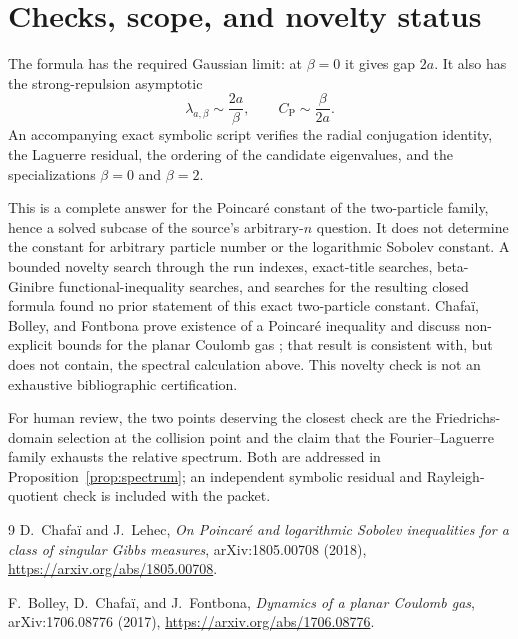 \documentclass[11pt]{article}
\begin{document}
\section{Checks, scope, and novelty status}

The formula has the required Gaussian limit: at $\beta=0$ it gives gap
$2a$.  It also has the strong-repulsion asymptotic
\[
 \lambda_{a,\beta}\sim\frac{2a}{\beta},\qquad
 C_{\mathrm P}\sim\frac{\beta}{2a}.
\]
An accompanying exact symbolic script verifies the radial conjugation
identity, the Laguerre residual, the ordering of the candidate eigenvalues,
and the specializations $\beta=0$ and $\beta=2$.

This is a complete answer for the Poincar\'e constant of the two-particle
family, hence a solved subcase of the source's arbitrary-$n$ question.  It
does not determine the constant for arbitrary particle number or the
logarithmic Sobolev constant.  A bounded novelty search through the run
indexes, exact-title searches, beta-Ginibre functional-inequality searches,
and searches for the resulting closed formula found no prior statement of
this exact two-particle constant.  Chafa\"i, Bolley, and Fontbona prove
existence of a Poincar\'e inequality and discuss non-explicit bounds for the
planar Coulomb gas \cite{CBF}; that result is consistent with, but does not
contain, the spectral calculation above.  This novelty check is not an
exhaustive bibliographic certification.

For human review, the two points deserving the closest check are the
Friedrichs-domain selection at the collision point and the claim that the
Fourier--Laguerre family exhausts the relative spectrum.  Both are addressed
in Proposition~\ref{prop:spectrum}; an independent symbolic residual and
Rayleigh-quotient check is included with the packet.

\begin{thebibliography}{9}
D.~Chafa\"i and J.~Lehec,
\emph{On Poincar\'e and logarithmic Sobolev inequalities for a class of
singular Gibbs measures}, arXiv:1805.00708 (2018),
\url{https://arxiv.org/abs/1805.00708}.

F.~Bolley, D.~Chafa\"i, and J.~Fontbona,
\emph{Dynamics of a planar Coulomb gas}, arXiv:1706.08776 (2017),
\url{https://arxiv.org/abs/1706.08776}.
\end{thebibliography}
\end{document}
